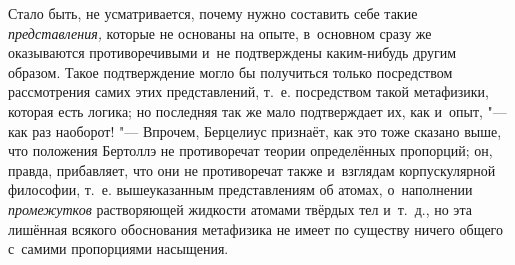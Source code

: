 Стало быть, не усматривается, почему нужно составить себе такие
{\em представления,} которые не основаны на опыте, в~основном сразу же
оказываются противоречивыми и~не подтверждены каким-нибудь другим образом.
Такое подтверждение могло бы получиться только посредством рассмотрения самих
этих представлений, т.~е. посредством такой метафизики, которая есть логика; но
последняя так же мало подтверждает их, как и~опыт, "--- как раз наоборот! "---
Впрочем, Берцелиус признаёт, как это тоже сказано выше, что положения Бертоллэ
не противоречат теории определённых пропорций; он, правда, прибавляет, что они
не противоречат также и~взглядам корпускулярной философии, т.~е. вышеуказанным
представлениям об атомах, о~наполнении {\em промежутков} растворяющей жидкости
атомами твёрдых тел и~т.~д., но эта лишённая всякого обоснования метафизика не
имеет по существу ничего общего с~самими пропорциями насыщения.

